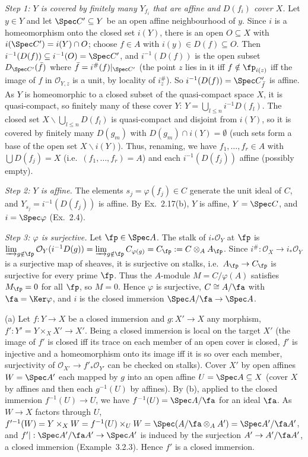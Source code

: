 \documentclass[11pt]{article}
\begin{document}
\emph{Step 1: $Y$ is covered by finitely many $Y_{f_i}$ that are affine and $D(f_i)$ cover $X$.} Let $y\in Y$ and let $\Spec C'\subseteq Y$ be an open affine neighbourhood of $y$. Since $i$ is a homeomorphism onto the closed set $i(Y)$, there is an open $O\subseteq X$ with $i(\Spec C')=i(Y)\cap O$; choose $f\in A$ with $i(y)\in D(f)\subseteq O$. Then $i^{-1}(D(f))\subseteq i^{-1}(O)=\Spec C'$, and $i^{-1}(D(f))$ is the open subset $D_{\Spec C'}(\bar f)$ where $\bar f=i^\#(f)|_{\Spec C'}$ (the point $z$ lies in it iff $f\notin\fp_{i(z)}$ iff the image of $f$ in $\mathcal O_{Y,z}$ is a unit, by locality of $i^\#_z$). So $i^{-1}(D(f))=\Spec C'_{\bar f}$ is affine. As $Y$ is homeomorphic to a closed subset of the quasi-compact space $X$, it is quasi-compact, so finitely many of these cover $Y$: $Y=\bigcup_{l\le n}i^{-1}D(f_l)$. The closed set $X\smallsetminus\bigcup_{l\le n}D(f_l)$ is quasi-compact and disjoint from $i(Y)$, so it is covered by finitely many $D(g_m)$ with $D(g_m)\cap i(Y)=\emptyset$ (such sets form a base of the open set $X\smallsetminus i(Y)$). Thus, renaming, we have $f_1,\dots,f_r\in A$ with $\bigcup D(f_j)=X$ (i.e.\ $(f_1,\dots,f_r)=A$) and each $i^{-1}(D(f_j))$ affine (possibly empty).

\emph{Step 2: $Y$ is affine.} The elements $s_j=\varphi(f_j)\in C$ generate the unit ideal of $C$, and $Y_{s_j}=i^{-1}(D(f_j))$ is affine. By Ex.~2.17(b), $Y$ is affine, $Y=\Spec C$, and $i=\Spec\varphi$ (Ex.~2.4).

\emph{Step 3: $\varphi$ is surjective.} Let $\fp\in\Spec A$. The stalk of $i_*\mathcal O_Y$ at $\fp$ is $\varinjlim_{g\notin\fp}\mathcal O_Y(i^{-1}D(g))=\varinjlim_{g\notin\fp}C_{\varphi(g)}=C_\fp:=C\otimes_AA_\fp$. Since $i^\#:\mathcal O_X\to i_*\mathcal O_Y$ is a surjective map of sheaves, it is surjective on stalks, i.e.\ $A_\fp\to C_\fp$ is surjective for every prime $\fp$. Thus the $A$-module $M=C/\varphi(A)$ satisfies $M_\fp=0$ for all $\fp$, so $M=0$. Hence $\varphi$ is surjective, $C\cong A/\fa$ with $\fa=\Ker\varphi$, and $i$ is the closed immersion $\Spec A/\fa\to\Spec A$.

(a) Let $f:Y\to X$ be a closed immersion and $g:X'\to X$ any morphism, $f':Y'=Y\times_XX'\to X'$. Being a closed immersion is local on the target $X'$ (the image of $f'$ is closed iff its trace on each member of an open cover is closed, $f'$ is injective and a homeomorphism onto its image iff it is so over each member, surjectivity of $\mathcal O_{X'}\to f'_*\mathcal O_{Y'}$ can be checked on stalks). Cover $X'$ by open affines $W=\Spec A'$ each mapped by $g$ into an open affine $U=\Spec A\subseteq X$ (cover $X$ by affines and then each $g^{-1}(U)$ by affines). By (b), applied to the closed immersion $f^{-1}(U)\to U$, we have $f^{-1}(U)=\Spec A/\fa$ for an ideal $\fa$. As $W\to X$ factors through $U$, $f'^{-1}(W)=Y\times_XW=f^{-1}(U)\times_UW=\Spec(A/\fa\otimes_AA')=\Spec A'/\fa A'$, and $f'|:\Spec A'/\fa A'\to\Spec A'$ is induced by the surjection $A'\to A'/\fa A'$, a closed immersion (Example~3.2.3). Hence $f'$ is a closed immersion.
\end{document}
